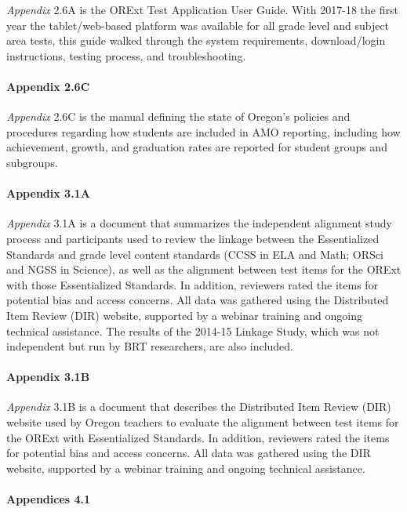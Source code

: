 \documentclass[]{article}
\let\oldparagraph\paragraph
\renewcommand{\paragraph}[1]{\oldparagraph{#1}\mbox{}}
\begin{document}
\emph{Appendix} 2.6A is the ORExt Test Application User Guide. With
2017-18 the first year the tablet/web-based platform was available for
all grade level and subject area tests, this guide walked through the
system requirements, download/login instructions, testing process, and
troubleshooting.

\paragraph{Appendix 2.6C}\label{appendix-2.6c}

\emph{Appendix} 2.6C is the manual defining the state of Oregon's
policies and procedures regarding how students are included in AMO
reporting, including how achievement, growth, and graduation rates are
reported for student groups and subgroups.

\paragraph{Appendix 3.1A}\label{appendix-3.1a}

\emph{Appendix} 3.1A is a document that summarizes the independent
alignment study process and participants used to review the linkage
between the Essentialized Standards and grade level content standards
(CCSS in ELA and Math; ORSci and NGSS in Science), as well as the
alignment between test items for the ORExt with those Essentialized
Standards. In addition, reviewers rated the items for potential bias and
access concerns. All data was gathered using the Distributed Item Review
(DIR) website, supported by a webinar training and ongoing technical
assistance. The results of the 2014-15 Linkage Study, which was not
independent but run by BRT researchers, are also included.

\paragraph{Appendix 3.1B}\label{appendix-3.1b}

\emph{Appendix} 3.1B is a document that describes the Distributed Item
Review (DIR) website used by Oregon teachers to evaluate the alignment
between test items for the ORExt with Essentialized Standards. In
addition, reviewers rated the items for potential bias and access
concerns. All data was gathered using the DIR website, supported by a
webinar training and ongoing technical assistance.

\paragraph{Appendices 4.1}\label{appendices-4.1}
\end{document}
